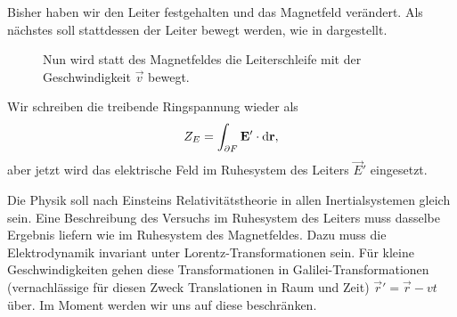 Bisher haben wir den Leiter festgehalten und das Magnetfeld verändert. Als nächstes soll stattdessen der Leiter bewegt werden, wie in  dargestellt.

\begin{figure}[ht]
	\centering
	\tfigInductionB
	\caption{Nun wird statt des Magnetfeldes die Leiterschleife mit der Geschwindigkeit $\vec v$ bewegt. }
	\label{fig:inductionB}
\end{figure}

Wir schreiben die treibende Ringspannung wieder als
\begin{equation}
	\label{eq:ringspannung_ruhesystem_leiter}
	Z_{E}=\int _{\partial F}\mathbf{E}'\cdot \mathop{}\!\mathrm{d} \mathbf{r},
\end{equation}
aber jetzt wird das elektrische Feld im Ruhesystem des Leiters $\vec {E}'$ eingesetzt.

Die Physik soll nach Einsteins Relativitätstheorie in allen Inertialsystemen gleich sein. Eine Beschreibung des Versuchs im Ruhesystem des Leiters muss dasselbe Ergebnis liefern wie im Ruhesystem des Magnetfeldes. Dazu muss die Elektrodynamik invariant unter Lorentz-Transformationen sein. Für kleine Geschwindigkeiten gehen diese Transformationen in Galilei-Transformationen (vernachlässige für diesen Zweck Translationen in Raum und Zeit) $\vec {r}'=\vec {r}-vt$ über. Im Moment werden wir uns auf diese beschränken.

